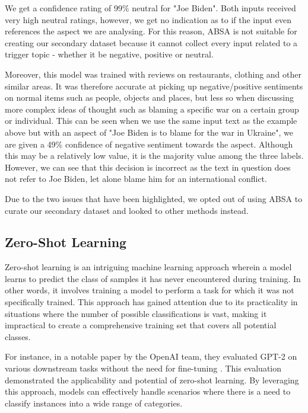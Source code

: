 We get a confidence rating of 99\% neutral for "Joe Biden". Both inputs received very high neutral ratings, however, we get no indication as to if the input even references the aspect we are analysing. For this reason, ABSA is not suitable for creating our secondary dataset because it cannot collect every input related to a trigger topic - whether it be negative, positive or neutral.

Moreover, this model was trained with reviews on restaurants, clothing and other similar areas. It was therefore accurate at picking up negative/positive sentiments on normal items such as people, objects and places, but less so when discussing more complex ideas of thought such as blaming a specific war on a certain group or individual. This can be seen when we use the same input text as the example above but with an aspect of "Joe Biden is to blame for the war in Ukraine", we are given a 49\% confidence of negative sentiment towards the aspect. Although this may be a relatively low value, it is the majority value among the three labels. However, we can see that this decision is incorrect as the text in question does not refer to Joe Biden, let alone blame him for an international conflict.

Due to the two issues that have been highlighted, we opted out of using ABSA to curate our secondary dataset and looked to other methods instead.

\subsection{Zero-Shot Learning}

Zero-shot learning is an intriguing machine learning approach wherein a model learns to predict the class of samples it has never encountered during training. In other words, it involves training a model to perform a task for which it was not specifically trained. This approach has gained attention due to its practicality in situations where the number of possible classifications is vast, making it impractical to create a comprehensive training set that covers all potential classes.

For instance, in a notable paper by the OpenAI team, they evaluated GPT-2 on various downstream tasks without the need for fine-tuning \cite{Radford2019LanguageMA}. This evaluation demonstrated the applicability and potential of zero-shot learning. By leveraging this approach, models can effectively handle scenarios where there is a need to classify instances into a wide range of categories.

